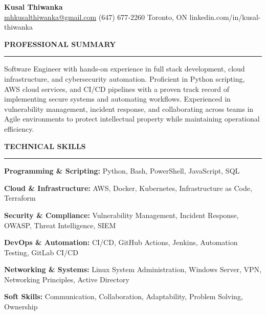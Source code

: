 \documentclass[10pt,letterpaper]{article}
\begin{document}
\begin{center}
{\LARGE\textbf{Kusal Thiwanka}}\\[3pt]
\href{mailto:mhkusalthiwanka@gmail.com}{mhkusalthiwanka@gmail.com}\hspace{2em}%
(647) 677{-}2260\hspace{2em}%
Toronto, ON\hspace{2em}
linkedin.com/in/kusal-thiwanka
\end{center}

\vspace{6pt}

\textbf{PROFESSIONAL SUMMARY}\\[-8pt]
\noindent\rule{\textwidth}{1pt}

\vspace{-2pt}

Software Engineer with hands-on experience in full stack development, cloud infrastructure, and cybersecurity automation. Proficient in Python scripting, AWS cloud services, and CI/CD pipelines with a proven track record of implementing secure systems and automating workflows. Experienced in vulnerability management, incident response, and collaborating across teams in Agile environments to protect intellectual property while maintaining operational efficiency.

\vspace{8pt}

\textbf{TECHNICAL SKILLS}\\[-8pt]
\noindent\rule{\textwidth}{1pt}

\vspace{-2pt}

\textbf{Programming \& Scripting:} Python, Bash, PowerShell, JavaScript, SQL

\textbf{Cloud \& Infrastructure:} AWS, Docker, Kubernetes, Infrastructure as Code, Terraform

\textbf{Security \& Compliance:} Vulnerability Management, Incident Response, OWASP, Threat Intelligence, SIEM

\textbf{DevOps \& Automation:} CI/CD, GitHub Actions, Jenkins, Automation Testing, GitLab CI/CD

\textbf{Networking \& Systems:} Linux System Administration, Windows Server, VPN, Networking Principles, Active Directory

\textbf{Soft Skills:} Communication, Collaboration, Adaptability, Problem Solving, Ownership

\vspace{8pt}
\end{document}
